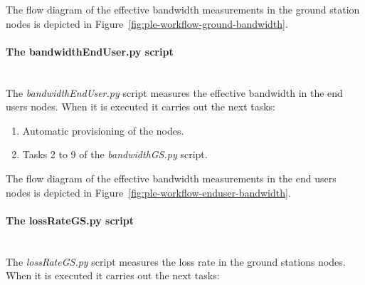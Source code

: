 The flow diagram of the effective bandwidth measurements in the ground station nodes is depicted in Figure~\ref{fig:ple-workflow-ground-bandwidth}.

\paragraph{The bandwidthEndUser.py script}~\\

The \emph{bandwidthEndUser.py} script measures the effective bandwidth in the
end users nodes. When it is executed it carries out the next tasks:
\begin{enumerate}
\item Automatic provisioning of the nodes.
\item Tasks 2 to 9 of the \emph{bandwidthGS.py} script.
\end{enumerate}

The flow diagram of the effective bandwidth measurements in the end users nodes is depicted in Figure~\ref{fig:ple-workflow-enduser-bandwidth}.

\paragraph{The lossRateGS.py script}~\\

The \emph{lossRateGS.py}  script measures the loss rate in the ground stations
nodes. When it is executed it carries out the next tasks:

